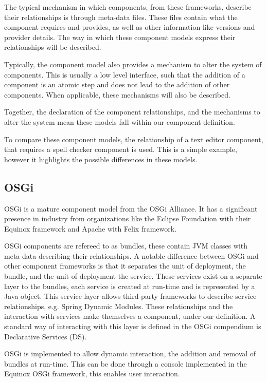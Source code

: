 The typical mechanism in which components, from these frameworks, describe their relationships is through meta-data files.
These files contain what the component requires and provides, as well as other information like versions and provider details.
The way in which these component models express their relationships will be described.

Typically, the component model also provides a mechanism to alter the system of components.
This is usually a low level interface, such that the addition of a component is an atomic step and does not lead to the addition of other components.
When applicable, these mechanisms will also be described.

Together, the declaration of the component relationships, and the mechanisms to alter the system mean these models fall within our component definition.

To compare these component models, the relationship of a text editor component, that requires a spell checker component is used.
This is a simple example, however it highlights the possible differences in these models.


\subsection{OSGi}
OSGi is a mature component model from the OSGi Alliance.
It has a significant presence in industry \cite{Kriens2008} from organizations like the Eclipse Foundation with their Equinox framework and Apache with Felix framework.

OSGi components are refereed to as bundles, these contain JVM classes with meta-data describing their relationships.
A notable difference between OSGi and other component frameworks is that it separates the unit of deployment, the bundle, and the unit of deployment the service.
These services exist on a separate layer to the bundles, each service is created at run-time and is represented by a Java object.
This service layer allows third-party frameworks to describe service relationships, e.g. Spring Dynamic Modules.
These relationships and the interaction with services make themselves a component, under our definition.
A standard way of interacting with this layer is defined in the OSGi compendium is Declarative Services (DS).

OSGi is implemented to allow dynamic interaction, the addition and removal of bundles at run-time.
This can be done through a console implemented in the Equinox OSGi framework, this enables user interaction.

